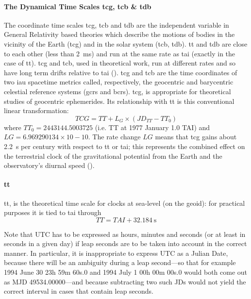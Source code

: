 \paragraph{The Dynamical Time Scales \gls{tcg}, \gls{tcb} \& \gls{tdb}}
\label{par:dynamical-time-scales}
The coordinate time scales \gls{tcg}, \gls{tcb} and \gls{tdb} are the independent
variable in General Relativity based theories which describe the motions of bodies in 
the vicinity of the Earth (\gls{tcg}) and in the solar system (\gls{tcb}, \gls{tdb}).
\gls{tt} and \gls{tdb} are close to each other (less than \SI{2}{\milli\second}) and 
run at the same rate as \gls{tai} (exactly in the case of \gls{tt}). \gls{tcg}
and \gls{tcb}, used in theoretical work, run at different rates and so have long 
term drifts relative to \gls{tai} (\cite{sofa2021ts}). \gls{tcg} and \gls{tcb} are 
the time coordinates of two \gls{iau} spacetime metrics called, respectively, the
geocentric and barycentric celestial reference systems (\gls{gcrs} and \gls{bcrs}).
\gls{tcg}, is appropriate for theoretical studies of geocentric ephemerides.
Its relationship with \gls{tt} is this conventional linear transformation:
\begin{equation}
    TCG = TT + L_G \times (JD_{TT} - TT_{0})
\end{equation}
where $TT_0 = 2443144.5003725$ (i.e. TT at 1977 January 1.0 TAI) and 
$LG = 6.969290134 \times 10-10$. The rate change $LG$ means that \gls{tcg} gains about
\SI{2.2}{\second} per century with respect to \gls{tt} or \gls{tai}; this represents 
the combined effect on the terrestrial clock of the gravitational potential from the 
Earth and the observatory's diurnal speed (\cite{sofa2021ts}).


\paragraph{\gls{tt}}\label{par:tt}
\gls{tt}, is the theoretical time scale for clocks at sea-level (on the geoid): for 
practical purposes it is tied to \gls{tai} through
\begin{equation}
    TT = TAI + \SI{32.184}{\second}
\end{equation}


Note that UTC has to be expressed as hours, minutes and seconds (or at least in seconds in a
given day) if leap seconds are to be taken into account in the correct manner. In particular, it
is inappropriate to express UTC as a Julian Date, because there will be an ambiguity during a
leap second—so that for example 1994 June 30 23h 59m 60s.0 and 1994 July 1 00h 00m 00s.0 would
both come out as MJD 49534.00000—and because subtracting two such JDs would not yield the
correct interval in cases that contain leap seconds.
